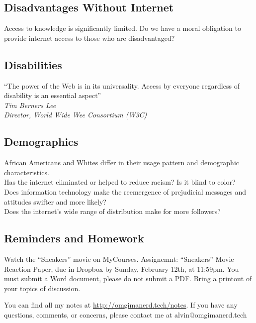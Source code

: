 \documentclass[letterpaper, 12pt]{article}
\begin{document}
\subsection*{Disadvantages Without Internet}
Access to knowledge is significantly limited.
Do we have a moral obligation to provide internet access to those who are
disadvantaged?

\subsection*{Disabilities}
``The power of the Web is in its universality. Access by everyone regardless of
disability is an essential aspect'' \\
\textit{Tim Berners Lee} \\
\textit{Director, World Wide Wee Consortium (W3C)}

\subsection*{Demographics}
African Americans and Whites differ in their usage pattern and demographic
characteristics. \\
Has the internet eliminated or helped to reduce racism? Is it blind to color? \\
Does information technology make the reemergence of prejudicial messages and
attitudes swifter and more likely? \\
Does the internet's wide range of distribution make for more followers?

\subsection*{Reminders and Homework}
Watch the ``Sneakers'' movie on MyCourses.
Assignemnt: ``Sneakers'' Movie Reaction Paper, due in Dropbox by Sunday,
February 12th, at 11:59pm. You must submit a Word document, please do not
submit a PDF.
Bring a printout of your topics of discussion.

\begin{center}
  You can find all my notes at \url{http://omgimanerd.tech/notes}. If you have
  any questions, comments, or concerns, please contact me at
  alvin@omgimanerd.tech
\end{center}
\end{document}
